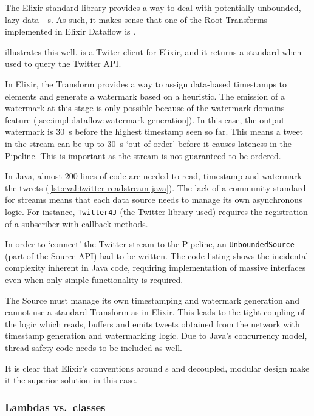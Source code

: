 The Elixir standard library provides a way to deal with potentially unbounded, lazy data---s.
As such, it makes sense that one of the Root Transforms implemented in Elixir Dataflow is .

 illustrates this well.
 \cite{ExTwitter} is a Twiter client for Elixir, and it returns a standard  when used to query the Twitter API.

In Elixir, the  Transform provides a way to assign data-based timestamps to elements and generate a watermark based on a heuristic.
The emission of a watermark at this stage is only possible because of the watermark domains feature (\cref{sec:impl:dataflow:watermark-generation}).
In this case, the output watermark is \SI{30}{\second} before the highest timestamp seen so far.
This means a tweet in the stream can be up to \SI{30}{\second} `out of order' before it causes lateness in the Pipeline.
This is important as the stream is not guaranteed to be ordered.

In Java, almost 200 lines of code are needed to read, timestamp and watermark the tweets (\cref{lst:eval:twitter-readstream-java}).
The lack of a community standard for streams means that each data source needs to manage its own asynchronous logic.
For instance, \texttt{Twitter4J} \cite{Twitter4J} (the Twitter library used) requires the registration of a subscriber with callback methods.

In order to `connect' the Twitter stream to the Pipeline, an \texttt{UnboundedSource} (part of the Source API) had to be written.
The code listing shows the incidental complexity inherent in Java code, requiring implementation of massive interfaces even when only simple functionality is required.

The Source must manage its own timestamping and watermark generation and cannot use a standard Transform as in Elixir.
This leads to the tight coupling of the logic which reads, buffers and emits tweets obtained from the network with timestamp generation and watermarking logic.
Due to Java's concurrency model, thread-safety code needs to be included as well.

It is clear that Elixir's conventions around s and decoupled, modular design make it the superior solution in this case.

\subsubsection{Lambdas vs.\ classes}

